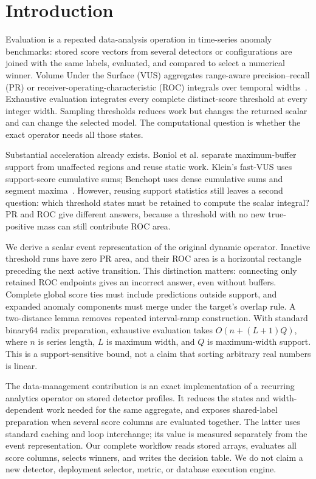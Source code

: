 \section{Introduction}
Evaluation is a repeated data-analysis operation in time-series anomaly
benchmarks: stored score vectors from several detectors or configurations are
joined with the same labels, evaluated, and compared to select a numerical
winner. Volume Under the Surface (VUS) aggregates range-aware precision--recall
(PR) or receiver-operating-characteristic (ROC) integrals over temporal
widths~\cite{paparrizos2022,boniol2025}. Exhaustive evaluation integrates every
complete distinct-score threshold at every integer width. Sampling thresholds
reduces work but changes the returned scalar and can change the selected model.
The computational question is whether the exact operator needs all those states.

Substantial acceleration already exists. Boniol et al. separate
maximum-buffer support from unaffected regions and reuse static work.
Klein's fast-VUS uses support-score cumulative sums; Benchopt uses dense
cumulative sums and segment maxima~\cite{boniol2025,klein2026,benchopt2026}.
However, reusing support statistics still leaves a second question: which
threshold states must be retained to compute the scalar integral? PR and ROC
give different answers, because a threshold with no new true-positive mass
can still contribute ROC area.

We derive a scalar event representation of the original dynamic operator.
Inactive threshold runs have zero PR area, and their ROC area is a horizontal
rectangle preceding the next active transition. This distinction matters:
connecting only retained ROC endpoints gives an incorrect answer, even without
buffers. Complete global score ties must include predictions outside support,
and expanded anomaly components must merge under the target's overlap rule.
A two-distance lemma removes repeated interval-ramp construction. With standard
binary64 radix preparation, exhaustive evaluation takes
$O(n+(L+1)Q)$, where $n$ is series length, $L$ is maximum width, and $Q$ is
maximum-width support. This is a support-sensitive bound, not a claim that
sorting arbitrary real numbers is linear.

The data-management contribution is an exact implementation of a recurring
analytics operator on stored detector profiles. It reduces the states and
width-dependent work needed for the same aggregate, and exposes shared-label
preparation when several score columns are evaluated together. The latter uses
standard caching and loop interchange; its value is measured separately from
the event representation. Our complete workflow reads stored arrays, evaluates
all score columns, selects winners, and writes the decision table. We do not
claim a new detector, deployment selector, metric, or database execution engine.

